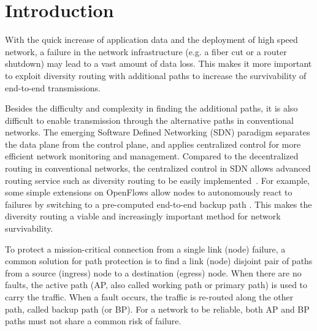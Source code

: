 \section{Introduction}

With the quick increase of application data and the deployment of high speed network, a failure in the network infrastructure (e.g. a fiber cut or a router shutdown) may lead to a vast amount of data loss. This makes it more important to exploit diversity routing with additional paths to increase the survivability\cite{yallouz2017tunable} of end-to-end transmissions.

Besides the difficulty and complexity in finding the additional paths, it is also difficult to enable transmission through the alternative paths in conventional networks. The emerging Software Defined Networking (SDN) paradigm\cite{mckeown2008openflow,jain2013b4} separates the data plane from the control plane, and applies centralized control for more efficient network monitoring and management. Compared to the decentralized routing in conventional networks, the centralized control in SDN allows advanced routing service such as diversity routing to be easily implemented~\cite{jarschel2014interfaces,muller2014survivor}. For example, some simple extensions on OpenFlows allow nodes to autonomously react to failures by switching to a pre-computed end-to-end backup path \cite{kempf2012scalable,sgambelluri2013openflow}. This makes the diversity routing a viable and increasingly important method for network survivability.


 To protect a mission-critical connection from a single link (node) failure, a common solution for path protection\cite{kuipers2012overview} is to find a link (node) disjoint pair of paths from a source (ingress) node to a destination (egress) node. When there are no faults, the active path (AP, also called working path or primary path) is used to carry the traffic. When a fault occurs, the traffic is re-routed along the other path, called backup path (or BP). For a network to be reliable, both AP and BP paths must not share a common risk of failure.


